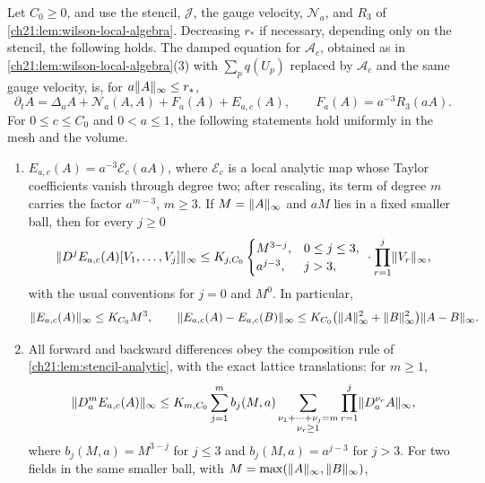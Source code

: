 \begin{lemma}\label{ch21:lem:quartic-plaquette-force}
Let $C_0\ge0$, and use the stencil, $\mathcal J$, the gauge velocity, $\mathcal N_a$, and $R_3$ of \cref{ch21:lem:wilson-local-algebra}. Decreasing $r_*$ if necessary, depending only on the stencil, the following holds. The damped equation for $\mathcal A_c$, obtained as in \cref{ch21:lem:wilson-local-algebra}(3) with $\sum_pq(U_p)$ replaced by $\mathcal A_c$ and the same gauge velocity, is, for $a\lVert A\rVert_\infty\le r_*$,
\begin{equation}\label{ch21:eq:quartic-force-equation}
 \partial_tA=\Delta_aA+\mathcal N_a(A,A)+F_a(A)+E_{a,c}(A),\qquad F_a(A)=a^{-3}R_3(aA).
\end{equation}
For $0\le c\le C_0$ and $0<a\le1$, the following statements hold uniformly in the mesh and the volume.
\begin{enumerate}
\item $E_{a,c}(A)=a^{-3}\mathscr E_c(aA)$, where $\mathscr E_c$ is a local analytic map whose Taylor coefficients vanish through degree two; after rescaling, its term of degree $m$ carries the factor $a^{m-3}$, $m\ge3$. If $M=\lVert A\rVert_\infty$ and $aM$ lies in a fixed smaller ball, then for every $j\ge0$
\begin{equation}\label{ch21:eq:quartic-field-jets}
 \lVert D^jE_{a,c}(A)[V_1,\ldots,V_j]\rVert_\infty\le K_{j,C_0}
 \begin{cases}M^{3-j},&0\le j\le3,\\ a^{j-3},&j>3,\end{cases}
 \ \cdot\prod_{r=1}^j\lVert V_r\rVert_\infty,
\end{equation}
with the usual conventions for $j=0$ and $M^0$. In particular,
\[
 \lVert E_{a,c}(A)\rVert_\infty\le K_{C_0}M^3,\qquad
 \lVert E_{a,c}(A)-E_{a,c}(B)\rVert_\infty\le K_{C_0}\bigl(\lVert A\rVert_\infty^2+\lVert B\rVert_\infty^2\bigr)\lVert A-B\rVert_\infty .
\]
\item All forward and backward differences obey the composition rule of \cref{ch21:lem:stencil-analytic}, with the exact lattice translations: for $m\ge1$,
\begin{equation}\label{ch21:eq:quartic-shifted-jets}
 \lVert D_a^mE_{a,c}(A)\rVert_\infty\le K_{m,C_0}\sum_{j=1}^mb_j(M,a)\sum_{\substack{\nu_1+\cdots+\nu_j=m\\ \nu_r\ge1}}\prod_{r=1}^j\lVert D_a^{\nu_r}A\rVert_\infty,
\end{equation}
where $b_j(M,a)=M^{3-j}$ for $j\le3$ and $b_j(M,a)=a^{j-3}$ for $j>3$. For two fields in the same smaller ball, with $M=\max(\lVert A\rVert_\infty,\lVert B\rVert_\infty)$,

\end{enumerate}
\end{lemma}

